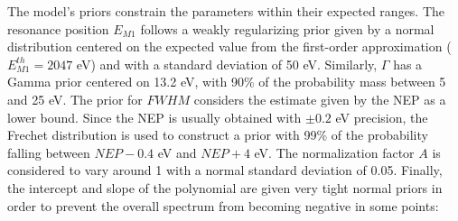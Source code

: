 The model's priors constrain the parameters within their expected ranges. The resonance position $E_{M1}$ follows a
weakly regularizing prior given by a normal distribution centered on the expected value from the first-order approximation
($E_{M1}^{th} = 2047$ eV) and with a standard deviation of 50 eV. Similarly, $\Gamma$ has a Gamma prior centered on 13.2 eV,
with 90\% of the probability mass between 5 and 25 eV. The prior for $FWHM$ considers the estimate given by the NEP as
a lower bound. Since the NEP is usually obtained with $\pm 0.2$ eV precision, the Frechet distribution is used to construct a prior with 99\% of the probability falling between $NEP-0.4$ eV and $NEP+4$ eV. The normalization factor $A$ is
considered to vary around 1 with a normal standard deviation of 0.05. Finally, the intercept and slope of the polynomial are
given very tight normal priors in order to prevent the overall spectrum from becoming negative in some points:

